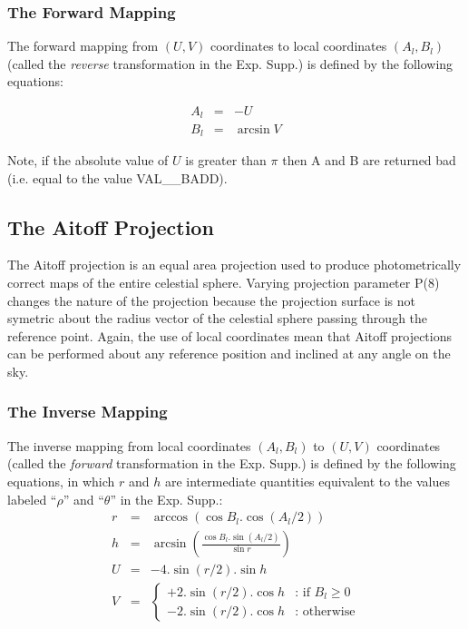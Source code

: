 \subsubsection {The Forward Mapping}
The forward mapping from $(U,V)$ coordinates to local coordinates
$(A_{l},B_{l})$ (called the {\em reverse} transformation in the Exp. Supp.) is
defined by the following equations: 

\begin{eqnarray*}
A_{l} & = & -U\\
B_{l} & = & \arcsin V
\end{eqnarray*}

Note, if the absolute value of $U$ is greater than $\pi$ then A and B are 
returned bad (i.e. equal to the value VAL\_\_BADD).

\subsection {The Aitoff Projection}
The Aitoff projection is an equal area projection used to produce
photometrically correct maps of the entire celestial sphere. Varying projection
parameter P(8) changes the nature of the projection because the projection
surface is not symetric about the radius vector of the celestial sphere passing
through the reference point. Again, the use of local coordinates mean that
Aitoff projections can be performed about any reference position and inclined at
any angle on the sky. 

\subsubsection {The Inverse Mapping}
The inverse mapping from local coordinates $(A_{l},B_{l})$ to $(U,V)$ 
coordinates 
(called the {\em forward} transformation in the Exp. Supp.) is defined by the
following equations, in which $r$ and $h$ are intermediate quantities equivalent
to the values labeled ``$\rho$'' and ``$\theta$'' in the Exp. Supp.: 
\begin{eqnarray*}
r & = & \arccos (\cos B_{l}.\cos (A_{l}/2) )\\
h & = & \arcsin \left(\frac {\cos B_{l}.\sin(A_{l}/2)}{\sin r}\right)\\
U & = & -4.\sin (r/2).\sin h\\
V & = & \left\{ \begin{array}{ll}
                 +2.\sin(r/2).\cos h   & \mbox{: if $B_{l}\geq0$}\\
                 -2.\sin(r/2).\cos h   & \mbox{: otherwise}
                \end{array}
        \right.\\
\end{eqnarray*}

